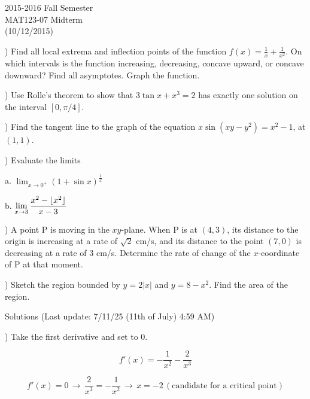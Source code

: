 \documentclass{article}
\DeclarePairedDelimiter\floor{\lfloor}{\rfloor}
\begin{document}
\large

\begin{center}
2015-2016 Fall Semester\\MAT123-07 Midterm\\(10/12/2015)
\end{center}

) Find all local extrema and inflection points of the function $f(x) = \frac{1}{x} + \frac{1}{x^2}$. On which intervals is the function increasing, decreasing, concave upward, or concave downward? Find all asymptotes. Graph the function.


\hfill

) Use Rolle's theorem to show that $3\tan x + x^3 = 2$ has exactly one solution on the interval $[0,\pi/4]$.

\hfill

) Find the tangent line to the graph of the equation $x \sin(xy-y^2) = x^2-1$, at $(1,1)$.

\hfill

) Evaluate the limits

a. $\displaystyle \lim_{x\to 0^+} (1+\sin x)^{\frac{1}{x}}$

b. $\displaystyle \lim_{x\to 3} \frac{x^2-\floor{x^2}}{x-3}$

\hfill

) A point P is moving in the $xy$-plane. When P is at $(4, 3)$, its distance to the origin is increasing at a rate of $\sqrt{2}$ cm/s, and its distance to the point $(7, 0)$ is decreasing at a rate of 3 cm/s. Determine the rate of change of the $x$-coordinate of P at that moment.

\hfill

) Sketch the region bounded by $y=2|x|$ and $y=8-x^2$. Find the area of the region.

\newpage

\begin{center}
Solutions (Last update: 7/11/25 (11th of July) 4:59 AM)
\end{center}

) Take the first derivative and set to 0.

\begin{equation*}f'(x) = -\frac{1}{x^2} - \frac{2}{x^3}\end{equation*}

\begin{equation*}f'(x) = 0\,\rightarrow\,\frac{2}{x^3} = -\frac{1}{x^2}\,\rightarrow\,x = -2 \, (\text{candidate for a critical point})\end{equation*}
\end{document}
